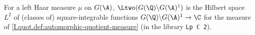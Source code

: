 For a left Haar measure $\mu$ on $G(\A)$, $\Ltwo(G(\Q)\backslash G(\A)^1)$ is the Hilbert space $L^2$ of (classes of)
square-integrable functions $G(\Q)\backslash G(\A)^1\to\C$ for the measure of \cref{I.quot.def:automorphic-quotient-measure}
(in the library \texttt{Lp ℂ 2}).
